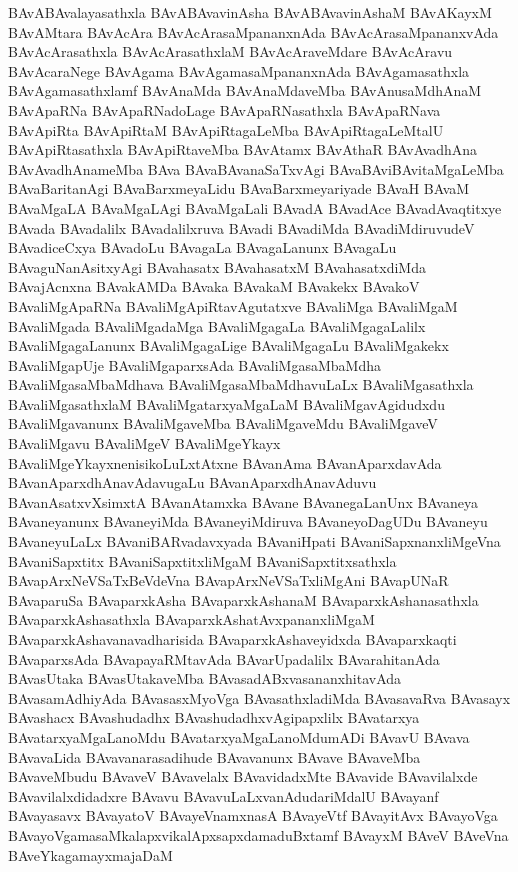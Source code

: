 {BAvABAvalayasathxla
BAvABAvavinAsha
BAvABAvavinAshaM
BAvAKayxM
BAvAMtara
BAvAcAra
BAvAcArasaMpananxnAda
BAvAcArasaMpananxvAda
BAvAcArasathxla
BAvAcArasathxlaM
BAvAcAraveMdare
BAvAcAravu
BAvAcaraNege
BAvAgama
BAvAgamasaMpananxnAda
BAvAgamasathxla
BAvAgamasathxlamf
BAvAnaMda
BAvAnaMdaveMba
BAvAnusaMdhAnaM
BAvApaRNa
BAvApaRNadoLage
BAvApaRNasathxla
BAvApaRNava
BAvApiRta
BAvApiRtaM
BAvApiRtagaLeMba
BAvApiRtagaLeMtalU
BAvApiRtasathxla
BAvApiRtaveMba
BAvAtamx
BAvAthaR
BAvAvadhAna
BAvAvadhAnameMba
BAva
BAvaBAvanaSaTxvAgi
BAvaBAviBAvitaMgaLeMba
BAvaBaritanAgi
BAvaBarxmeyaLidu
BAvaBarxmeyariyade
BAvaH
BAvaM
BAvaMgaLA
BAvaMgaLAgi
BAvaMgaLali
BAvadA
BAvadAce
BAvadAvaqtitxye
BAvada
BAvadalilx
BAvadalilxruva
BAvadi
BAvadiMda
BAvadiMdiruvudeV
BAvadiceCxya
BAvadoLu
BAvagaLa
BAvagaLanunx
BAvagaLu
BAvaguNanAsitxyAgi
BAvahasatx
BAvahasatxM
BAvahasatxdiMda
BAvajAcnxna
BAvakAMDa
BAvaka
BAvakaM
BAvakekx
BAvakoV
BAvaliMgApaRNa
BAvaliMgApiRtavAgutatxve
BAvaliMga
BAvaliMgaM
BAvaliMgada
BAvaliMgadaMga
BAvaliMgagaLa
BAvaliMgagaLalilx
BAvaliMgagaLanunx
BAvaliMgagaLige
BAvaliMgagaLu
BAvaliMgakekx
BAvaliMgapUje
BAvaliMgaparxsAda
BAvaliMgasaMbaMdha
BAvaliMgasaMbaMdhava
BAvaliMgasaMbaMdhavuLaLx
BAvaliMgasathxla
BAvaliMgasathxlaM
BAvaliMgatarxyaMgaLaM
BAvaliMgavAgidudxdu
BAvaliMgavanunx
BAvaliMgaveMba
BAvaliMgaveMdu
BAvaliMgaveV
BAvaliMgavu
BAvaliMgeV
BAvaliMgeYkayx
BAvaliMgeYkayxnenisikoLuLxtAtxne
BAvanAma
BAvanAparxdavAda
BAvanAparxdhAnavAdavugaLu
BAvanAparxdhAnavAduvu
BAvanAsatxvXsimxtA
BAvanAtamxka
BAvane
BAvanegaLanUnx
BAvaneya
BAvaneyanunx
BAvaneyiMda
BAvaneyiMdiruva
BAvaneyoDagUDu
BAvaneyu
BAvaneyuLaLx
BAvaniBARvadavxyada
BAvaniHpati
BAvaniSapxnanxliMgeVna
BAvaniSapxtitx
BAvaniSapxtitxliMgaM
BAvaniSapxtitxsathxla
BAvapArxNeVSaTxBeVdeVna
BAvapArxNeVSaTxliMgAni
BAvapUNaR
BAvaparuSa
BAvaparxkAsha
BAvaparxkAshanaM
BAvaparxkAshanasathxla
BAvaparxkAshasathxla
BAvaparxkAshatAvxpananxliMgaM
BAvaparxkAshavanavadharisida
BAvaparxkAshaveyidxda
BAvaparxkaqti
BAvaparxsAda
BAvapayaRMtavAda
BAvarUpadalilx
BAvarahitanAda
BAvasUtaka
BAvasUtakaveMba
BAvasadABxvasananxhitavAda
BAvasamAdhiyAda
BAvasasxMyoVga
BAvasathxladiMda
BAvasavaRva
BAvasayx
BAvashacx
BAvashudadhx
BAvashudadhxvAgipapxlilx
BAvatarxya
BAvatarxyaMgaLanoMdu
BAvatarxyaMgaLanoMdumADi
BAvavU
BAvava
BAvavaLida
BAvavanarasadihude
BAvavanunx
BAvave
BAvaveMba
BAvaveMbudu
BAvaveV
BAvavelalx
BAvavidadxMte
BAvavide
BAvavilalxde
BAvavilalxdidadxre
BAvavu
BAvavuLaLxvanAdudariMdalU
BAvayanf
BAvayasavx
BAvayatoV
BAvayeVnamxnasA
BAvayeVtf
BAvayitAvx
BAvayoVga
BAvayoVgamasaMkalapxvikalApxsapxdamaduBxtamf
BAvayxM
BAveV
BAveVna
BAveYkagamayxmajaDaM
}
